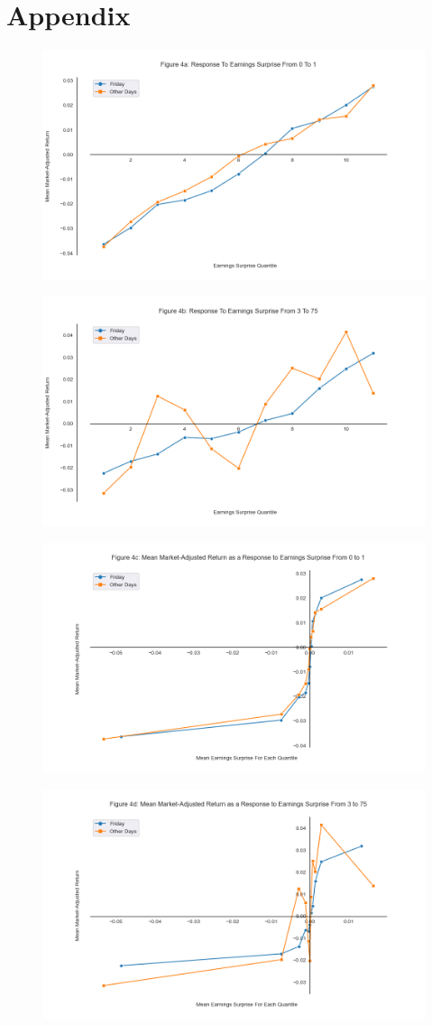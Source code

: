 \documentclass[11pt]{article}
\begin{document}
\section{Appendix}
\begin{figure}[H] 
    \centering
    \includegraphics[width=.8\textwidth]{fig4a.png}
\end{figure}

\begin{figure}[H] 
    \centering
    \includegraphics[width=.8\textwidth]{fig4b.png}
\end{figure}

\begin{figure}[H] 
    \centering
    \includegraphics[width=.8\textwidth]{fig4c.png}
\end{figure}

\begin{figure}[H] 
    \centering
    \includegraphics[width=.8\textwidth]{fig4d.png}
\end{figure}
\end{document}
